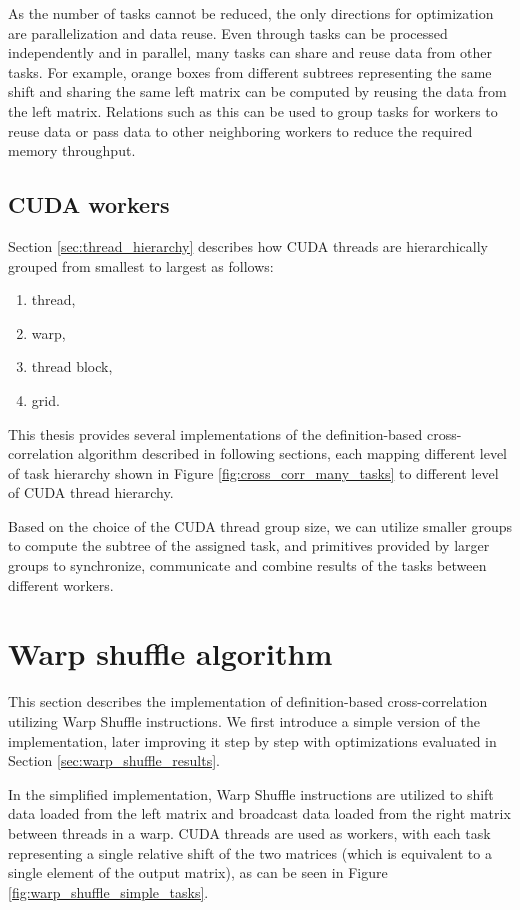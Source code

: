 As the number of tasks cannot be reduced, the only directions for optimization are parallelization and data reuse. Even through tasks can be processed independently and in parallel, many tasks can share and reuse data from other tasks. For example, orange boxes from different subtrees representing the same shift and sharing the same left matrix can be computed by reusing the data from the left matrix. Relations such as this can be used to group tasks for workers to reuse data or pass data to other neighboring workers to reduce the required memory throughput. 

\subsection{CUDA workers}

Section \ref{sec:thread_hierarchy} describes how CUDA threads are hierarchically grouped from smallest to largest as follows:

\begin{enumerate}
	\item thread,
	\item warp,
	\item thread block,
	\item grid.
\end{enumerate}

This thesis provides several implementations of the definition-based cross-correlation algorithm described in following sections, each mapping different level of task hierarchy shown in Figure \ref{fig:cross_corr_many_tasks} to different level of CUDA thread hierarchy.

Based on the choice of the CUDA thread group size, we can utilize smaller groups to compute the subtree of the assigned task, and primitives provided by larger groups to synchronize, communicate and combine results of the tasks between different workers.

\section{Warp shuffle algorithm}
\label{sec:warp_shuffle_alg}

This section describes the implementation of definition-based cross-correlation utilizing Warp Shuffle instructions. We first introduce a simple version of the implementation, later improving it step by step with optimizations evaluated in Section \ref{sec:warp_shuffle_results}.

In the simplified implementation, Warp Shuffle instructions are utilized to shift data loaded from the left matrix and broadcast data loaded from the right matrix between threads in a warp. CUDA threads are used as workers, with each task representing a single relative shift of the two matrices (which is equivalent to a single element of the output matrix), as can be seen in Figure \ref{fig:warp_shuffle_simple_tasks}.

